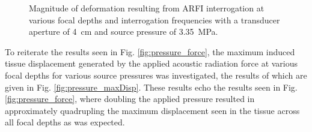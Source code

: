 			\begin{figure}[!htb]
				\centering
				\caption[ARFI-induced deformation at various depths and interrogation frequencies]{Magnitude of deformation resulting from ARFI interrogation at various focal depths and interrogation frequencies with a transducer aperture of \SI{4}{\cm} and source pressure of \SI{3.35}{\MPa}.}
				\label{fig:freq-depth-maxDisp}
			\end{figure}

			To reiterate the results seen in Fig. \ref{fig:pressure_force}, the maximum induced tissue displacement generated by the applied acoustic radiation force at various focal depths for various source pressures was investigated, the results of which are given in Fig. \ref{fig:pressure_maxDisp}. These results echo the results seen in Fig. \ref{fig:pressure_force}, where doubling the applied pressure resulted in approximately quadrupling the maximum displacement seen in the tissue across all focal depths as was expected.

